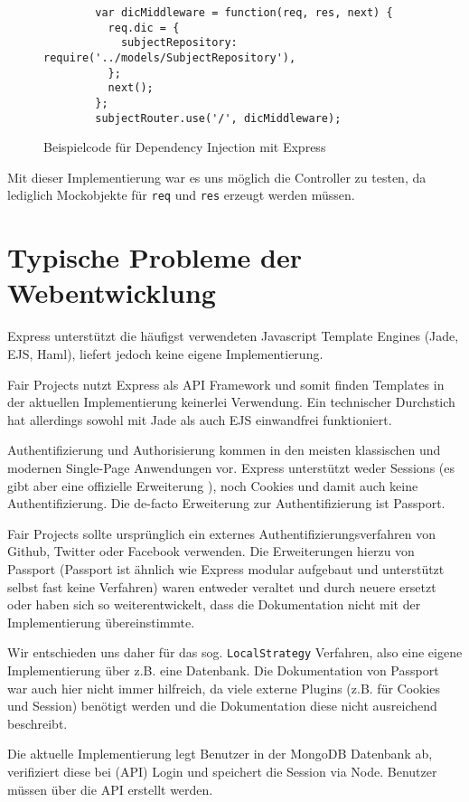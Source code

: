 \begin{figure}[t]
	\centering
	\begin{lstlisting}
		var dicMiddleware = function(req, res, next) {
		  req.dic = {
		    subjectRepository: require('../models/SubjectRepository'),
		  };
		  next();
		};
		subjectRouter.use('/', dicMiddleware);
	\end{lstlisting}
	\caption[dicMiddleware]{Beispielcode für Dependency Injection mit Express}
	\label{f:dicMiddleware}
\end{figure}

Mit dieser Implementierung war es uns möglich die Controller zu testen,
da lediglich Mockobjekte für \texttt{req} und \texttt{res} erzeugt
werden müssen.

\section{Typische Probleme der
Webentwicklung}\label{typische-probleme-der-webentwicklung}

Express unterstützt die häufigst verwendeten Javascript Template Engines
(Jade\cite{jade}, EJS\cite{ejs}, Haml\cite{haml}), liefert jedoch
keine eigene Implementierung.

Fair Projects nutzt Express als API Framework und somit finden Templates in der
aktuellen Implementierung keinerlei Verwendung. Ein technischer
Durchstich hat allerdings sowohl mit Jade als auch EJS einwandfrei funktioniert.

Authentifizierung und Authorisierung kommen in den meisten klassischen
und modernen Single-Page Anwendungen vor. Express unterstützt weder
Sessions (es gibt aber eine offizielle Erweiterung \cite{express-session}), noch
Cookies und damit auch keine Authentifizierung. Die de-facto Erweiterung
zur Authentifizierung ist Passport\cite{passport}.

Fair Projects sollte ursprünglich ein externes
Authentifizierungsverfahren von Github, Twitter oder Facebook verwenden.
Die Erweiterungen hierzu von Passport (Passport ist ähnlich wie Express
modular aufgebaut und unterstützt selbst fast keine Verfahren) waren
entweder veraltet und durch neuere ersetzt oder haben sich so
weiterentwickelt, dass die Dokumentation nicht mit der Implementierung
übereinstimmte.

Wir entschieden uns daher für das sog. \texttt{LocalStrategy} Verfahren,
also eine eigene Implementierung über z.B. eine Datenbank. Die
Dokumentation von Passport war auch hier nicht immer hilfreich, da viele
externe Plugins (z.B. für Cookies und Session) benötigt werden und die
Dokumentation diese nicht ausreichend beschreibt.

Die aktuelle Implementierung legt Benutzer in der MongoDB Datenbank ab,
verifiziert diese bei (API) Login und speichert die Session via Node.
Benutzer müssen über die API erstellt werden.